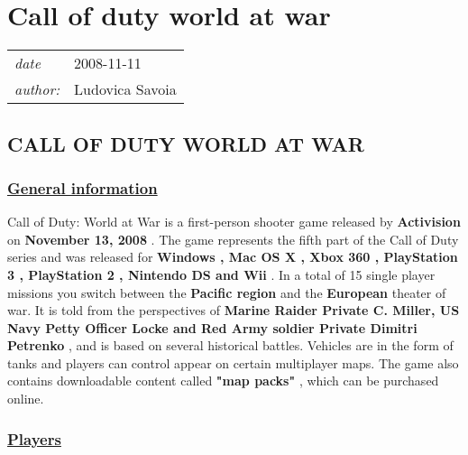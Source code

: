 \documentclass[a4paper,10pt]{book}
\newcommand{\pageHeader}[4]{
    \section{#1}
    \vspace{-0.3cm}
    \begin{table}[h!]
     \begin{tabular}{ll}
        \hline
        \textit{date} & #2 \\
        \textit{author: } & #3\\
        \hline
     \end{tabular}
    \end{table}
    \vspace{-0.3cm}
}
\begin{document}
 
 \newpage\pageHeader{Call of duty world at war}{2008-11-11}{Ludovica Savoia}{It immerses players into the most gritty and chaotic WWII combat ever experienced}
 \subsection{CALL OF DUTY WORLD AT WAR }
 \subsubsection{\underline{General information }}
 
        Call of Duty: World at War is a first-person shooter game released by  \textbf{Activision }  on  \textbf{November 13, 2008 } .
        The game represents the fifth part of the Call of Duty series and was released for  \textbf{Windows , Mac OS X , Xbox 360 , PlayStation 3 , PlayStation 2 , Nintendo DS and Wii } .
        In a total of 15 single player missions you switch between the  \textbf{Pacific region }  and the  \textbf{European }  theater of war. 
        It is told from the perspectives of  \textbf{Marine Raider Private C. Miller, US Navy Petty Officer Locke and Red Army soldier Private Dimitri Petrenko } , and is based on several historical battles.
        Vehicles are in the form of tanks and players can control appear on certain multiplayer maps. The game also contains downloadable content called  \textbf{"map packs" } , which can be purchased online.
         
 \subsubsection{\underline{Players }}
 
\end{document}
